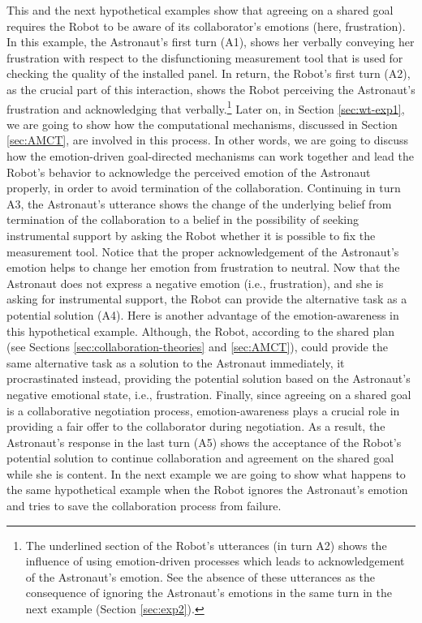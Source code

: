 This and the next hypothetical examples show that agreeing on a shared goal
requires the Robot to be aware of its collaborator's emotions (here,
frustration). In this example, the Astronaut's first turn (A1), shows her
verbally conveying her frustration with respect to the disfunctioning
measurement tool that is used for checking the quality of the installed panel.
In return, the Robot's first turn (A2), as the crucial part of this interaction,
shows the Robot perceiving the Astronaut's frustration and acknowledging that
verbally.\footnote{The underlined section of the Robot's utterances (in turn A2)
shows the influence of using emotion-driven processes which leads to
acknowledgement of the Astronaut's emotion. See the absence of these utterances
as the consequence of ignoring the Astronaut's emotions in the same turn in the
next example (Section \ref{sec:exp2}).} Later on, in Section \ref{sec:wt-exp1},
we are going to show how the computational mechanisms, discussed in Section
\ref{sec:AMCT}, are involved in this process. In other words, we are going to
discuss how the emotion-driven goal-directed mechanisms can work together and
lead the Robot's behavior to acknowledge the perceived emotion of the Astronaut
properly, in order to avoid termination of the collaboration. Continuing in turn
A3, the Astronaut's utterance shows the change of the underlying belief from
termination of the collaboration to a belief in the possibility of seeking
instrumental support by asking the Robot whether it is possible to fix the
measurement tool. Notice that the proper acknowledgement of the Astronaut's
emotion helps to change her emotion from frustration to neutral. Now that the
Astronaut does not express a negative emotion (i.e., frustration), and she is
asking for instrumental support, the Robot can provide the alternative task as a
potential solution (A4). Here is another advantage of the emotion-awareness in
this hypothetical example. Although, the Robot, according to the shared plan
(see Sections \ref{sec:collaboration-theories} and \ref{sec:AMCT}), could
provide the same alternative task as a solution to the Astronaut immediately, it
procrastinated instead, providing the potential solution based on the
Astronaut's negative emotional state, i.e., frustration. Finally, since agreeing
on a shared goal is a collaborative negotiation process, emotion-awareness plays
a crucial role in providing a fair offer to the collaborator during negotiation.
As a result, the Astronaut's response in the last turn (A5) shows the acceptance
of the Robot's potential solution to continue collaboration and agreement on the
shared goal while she is content. In the next example we are going to show what
happens to the same hypothetical example when the Robot ignores the Astronaut's
emotion and tries to save the collaboration process from failure.\\

